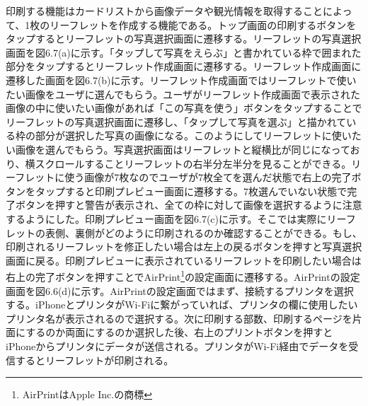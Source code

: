 印刷する機能はカードリストから画像データや観光情報を取得することによって、1枚のリーフレットを作成する機能である。トップ画面の印刷するボタンをタップするとリーフレットの写真選択画面に遷移する。リーフレットの写真選択画面を図6.7(a)に示す。「タップして写真をえらぶ」と書かれている枠で囲まれた部分をタップするとリーフレット作成画面に遷移する。リーフレット作成画面に遷移した画面を図6.7(b)に示す。リーフレット作成画面ではリーフレットで使いたい画像をユーザに選んでもらう。ユーザがリーフレット作成画面で表示された画像の中に使いたい画像があれば「この写真を使う」ボタンをタップすることでリーフレットの写真選択画面に遷移し、「タップして写真を選ぶ」と描かれている枠の部分が選択した写真の画像になる。このようにしてリーフレットに使いたい画像を選んでもらう。写真選択画面はリーフレットと縦横比が同じになっており、横スクロールすることリーフレットの右半分左半分を見ることができる。リーフレットに使う画像が7枚なのでユーザが7枚全てを選んだ状態で右上の完了ボタンをタップすると印刷プレビュー画面に遷移する。7枚選んでいない状態で完了ボタンを押すと警告が表示され、全ての枠に対して画像を選択するように注意するようにした。印刷プレビュー画面を図6.7(c)に示す。そこでは実際にリーフレットの表側、裏側がどのように印刷されるのか確認することができる。もし、印刷されるリーフレットを修正したい場合は左上の戻るボタンを押すと写真選択画面に戻る。印刷プレビューに表示されているリーフレットを印刷したい場合は右上の完了ボタンを押すことでAirPrint\footnote{AirPrintはApple Inc.の商標}の設定画面に遷移する。AirPrintの設定画面を図6.6(d)に示す。AirPrintの設定画面ではまず、接続するプリンタを選択する。iPhoneとプリンタがWi-Fiに繋がっていれば、プリンタの欄に使用したいプリンタ名が表示されるので選択する。次に印刷する部数、印刷するページを片面にするのか両面にするのか選択した後、右上のプリントボタンを押すとiPhoneからプリンタにデータが送信される。プリンタがWi-Fi経由でデータを受信するとリーフレットが印刷される。
